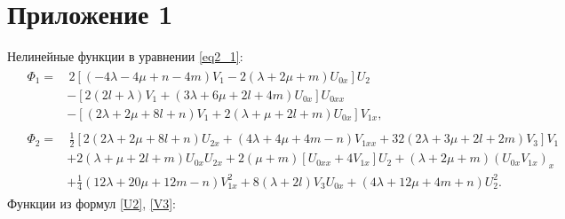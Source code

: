 \documentclass[12pt, a4paper]{report}
\begin{document}
\chapter*{Приложение 1}
Нелинейные функции в уравнении \eqref{eq2_1}:
\begin{equation} \nonumber
\begin{split}
&\begin{split}
\Phi_1 =& \, 2\left[(-4\lambda - 4\mu + n - 4m) V_1 - 2(\lambda + 2\mu + m) U_{0x}\right] U_2 \\
&- \left[ 2(2l + \lambda) V_1 + (3\lambda + 6\mu + 2l + 4m) U_{0x} \right] U_{0xx} \\
& - \left[ (2\lambda + 2\mu + 8l + n) V_1 + 2(\lambda + \mu + 2l + m) U_{0x} \right] V_{1x},
\end{split} \\
&\begin{split}
\Phi_2 =& \, \frac12 \left[2 (2\lambda + 2\mu + 8l + n) U_{2x} + (4\lambda + 4\mu + 4m - n) V_{1xx} + 32(2\lambda + 3\mu + 2l + 2m) V_3 \right] V_1 \\
& + 2(\lambda + \mu + 2l + m) U_{0x} U_{2x} + 2(\mu + m)\left[ U_{0xx} + 4 V_{1x} \right] U_2 + (\lambda + 2\mu + m)(U_{0x} V_{1x})_x\\
& + \frac14(12\lambda + 20\mu + 12m - n) V_{1x}^2 + 8(\lambda + 2l) V_3 U_{0x} + (4\lambda + 12\mu + 4m + n) U_2^2.
\end{split}
\end{split}
\end{equation}
Функции из формул \eqref{U2}, \eqref{V3}:
\end{document}
